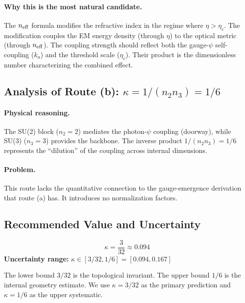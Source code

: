 \documentclass[12pt,a4paper]{article}
\begin{document}
\paragraph{Why this is the most natural candidate.}
The $n_{\rm eff}$ formula modifies the refractive index in the regime where
$\eta > \eta_c$.  The modification couples the EM energy density (through $\eta$)
to the optical metric (through $n_{\rm eff}$).  The coupling strength should
reflect both the gauge-$\psi$ self-coupling ($k_a$) and the threshold scale
($\eta_c$).  Their product is the dimensionless number characterizing
the combined effect.

\subsection{Analysis of Route (b): $\kappa = 1/(n_2 n_3) = 1/6$}

\paragraph{Physical reasoning.}
The SU(2) block ($n_2 = 2$) mediates the photon-$\psi$ coupling (doorway),
while SU(3) ($n_3 = 3$) provides the backbone.  The inverse product
$1/(n_2 n_3) = 1/6$ represents the ``dilution'' of the coupling across
internal dimensions.

\paragraph{Problem.}
This route lacks the quantitative connection to the gauge-emergence derivation
that route (a) has.  It introduces no normalization factors.

\subsection{Recommended Value and Uncertainty}

\begin{tcolorbox}[colback=green!5!white, colframe=green!50!black,
  title=Recommended $\kappa$ Value]
\begin{equation}
\boxed{\kappa = \frac{3}{32} \approx 0.094}
\end{equation}
\textbf{Uncertainty range:} $\kappa \in [3/32, 1/6] = [0.094, 0.167]$

The lower bound $3/32$ is the topological invariant.
The upper bound $1/6$ is the internal geometry estimate.
We use $\kappa = 3/32$ as the primary prediction and $\kappa = 1/6$
as the upper systematic.
\end{tcolorbox}
\end{document}
